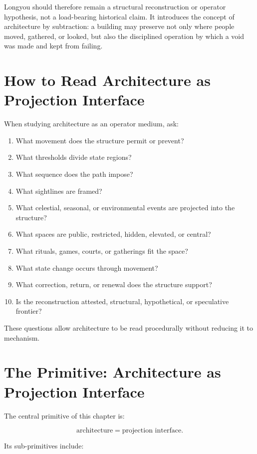 \documentclass[11pt]{book}
\begin{document}
Longyou should therefore remain a structural reconstruction or operator hypothesis, not a load-bearing historical claim. It introduces the concept of architecture by subtraction: a building may preserve not only where people moved, gathered, or looked, but also the disciplined operation by which a void was made and kept from failing.

\section{How to Read Architecture as Projection Interface}

When studying architecture as an operator medium, ask:

\begin{enumerate}[label=\arabic*.]
    \item What movement does the structure permit or prevent?
    \item What thresholds divide state regions?
    \item What sequence does the path impose?
    \item What sightlines are framed?
    \item What celestial, seasonal, or environmental events are projected into the structure?
    \item What spaces are public, restricted, hidden, elevated, or central?
    \item What rituals, games, courts, or gatherings fit the space?
    \item What state change occurs through movement?
    \item What correction, return, or renewal does the structure support?
    \item Is the reconstruction attested, structural, hypothetical, or speculative frontier?
\end{enumerate}

These questions allow architecture to be read procedurally without reducing it to mechanism.

\section{The Primitive: Architecture as Projection Interface}

The central primitive of this chapter is:

\[
\text{architecture} = \text{projection interface}.
\]

Its sub-primitives include:
\end{document}
